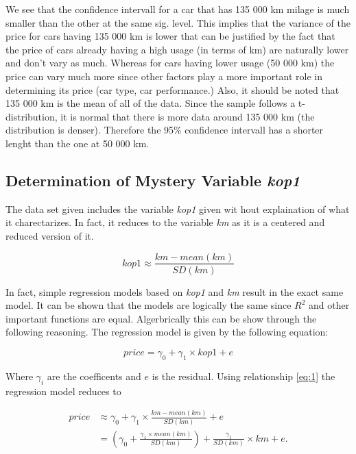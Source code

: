 \noindent
We see that the confidence intervall for a car that has 135 000 km milage is much smaller than the other at the same sig. level. This implies that the variance of the price for cars having 135 000 km is lower that can be justified by the fact that the price of cars already having a high usage (in terms of km) are naturally lower and don't vary as much. Whereas for cars having lower usage (50 000 km) the price can vary much more since other factors play a more important role in determining its price (car type, car performance.) Also, it should be noted that 135 000 km is the mean of all of the data. Since the sample follows a t-distribution, it is normal that there is more data around 135 000 km (the distribution is denser). Therefore the 95\% confidence intervall has a shorter lenght than the one at 50 000 km.

\subsection{Determination of Mystery Variable \textit{kop1}} %
\label{sub:det_myst_var}

The data set given includes the variable \textit{kop1} given wit hout explaination of what it charectarizes. In fact, it reduces to the variable \textit{km} as it is a centered and reduced version of it.

\begin{equation}\label{eq:1}
	kop1 \approx \frac{km - mean(km)}{SD(km)}
\end{equation}

\noindent
In fact, simple regression models based on \textit{kop1} and \textit{km} result in the exact same model. It can be shown that the models are logically the same since $R^2$ and other important functions are equal. Algerbrically this can be show through the following reasoning. The regression model is given by the following equation:

\begin{equation}\label{eq:price_kop1}
	price = \gamma_0 + \gamma_1 \times kop1 + e
\end{equation}

\noindent
Where $\gamma_i$ are the coefficents and $e$ is the residual. Using relationship \ref{eq:1} the regression model reduces to

\begin{equation}
	\begin{split}
	 price & \approx \gamma_0 + \gamma_1 \times \frac{km - mean(km)}{SD(km)}+ e \\ &
	 = (\gamma_0 +  \frac{\gamma_1 \times mean(km)}{SD(km)}) + \frac{\gamma_1}{SD(km)} \times km + e.
	 \end{split}
\end{equation}

